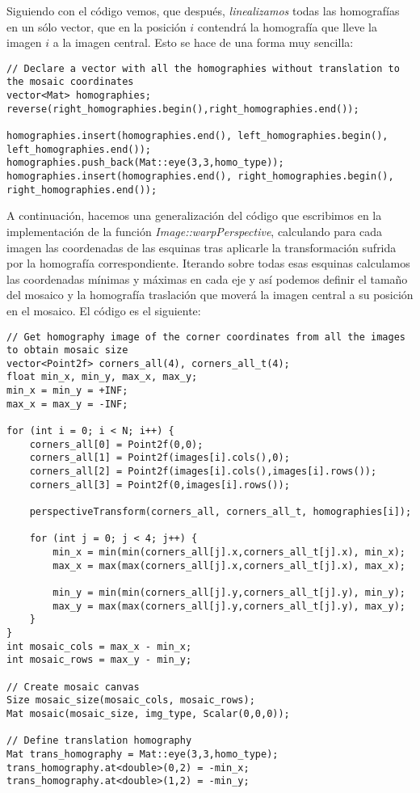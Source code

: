 \documentclass[a4paper, 11pt]{article}
\theoremstyle{definition}
\theoremstyle{theorem}
\begin{document}
    Siguiendo con el código vemos, que después, \emph{linealizamos} todas las homografías en un sólo vector, que en la posición $i$ contendrá la homografía que lleve la imagen $i$ a la imagen central. Esto se hace de una forma muy sencilla:
    \begin{lstlisting}
// Declare a vector with all the homographies without translation to the mosaic coordinates
vector<Mat> homographies;
reverse(right_homographies.begin(),right_homographies.end());

homographies.insert(homographies.end(), left_homographies.begin(), left_homographies.end());
homographies.push_back(Mat::eye(3,3,homo_type));
homographies.insert(homographies.end(), right_homographies.begin(), right_homographies.end());
    \end{lstlisting}

    A continuación, hacemos una generalización del código que escribimos en la implementación de la función \emph{Image::warpPerspective}, calculando para cada imagen las coordenadas de las esquinas tras aplicarle la transformación sufrida por la homografía correspondiente. Iterando sobre todas esas esquinas calculamos las coordenadas mínimas y máximas en cada eje y así podemos definir el tamaño del mosaico y la homografía traslación que moverá la imagen central a su posición en el mosaico. El código es el siguiente:
    \begin{lstlisting}
// Get homography image of the corner coordinates from all the images to obtain mosaic size
vector<Point2f> corners_all(4), corners_all_t(4);
float min_x, min_y, max_x, max_y;
min_x = min_y = +INF;
max_x = max_y = -INF;

for (int i = 0; i < N; i++) {
    corners_all[0] = Point2f(0,0);
    corners_all[1] = Point2f(images[i].cols(),0);
    corners_all[2] = Point2f(images[i].cols(),images[i].rows());
    corners_all[3] = Point2f(0,images[i].rows());

    perspectiveTransform(corners_all, corners_all_t, homographies[i]);

    for (int j = 0; j < 4; j++) {
        min_x = min(min(corners_all[j].x,corners_all_t[j].x), min_x);
        max_x = max(max(corners_all[j].x,corners_all_t[j].x), max_x);

        min_y = min(min(corners_all[j].y,corners_all_t[j].y), min_y);
        max_y = max(max(corners_all[j].y,corners_all_t[j].y), max_y);
    }
}
int mosaic_cols = max_x - min_x;
int mosaic_rows = max_y - min_y;

// Create mosaic canvas
Size mosaic_size(mosaic_cols, mosaic_rows);
Mat mosaic(mosaic_size, img_type, Scalar(0,0,0));

// Define translation homography
Mat trans_homography = Mat::eye(3,3,homo_type);
trans_homography.at<double>(0,2) = -min_x;
trans_homography.at<double>(1,2) = -min_y;
    \end{lstlisting}
\end{document}
